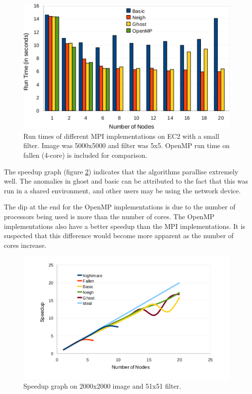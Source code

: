 \documentclass{article}
\begin{document}
\begin{figure}[h]
  \centering
  \includegraphics{images/mpi_vs_openmp}
  \caption{Run times of different MPI implementations on EC2 with a small
    filter. Image was 5000x5000 and filter was 5x5. OpenMP run time on fallen
    (4-core) is included for comparison.}
  \label{fig:mpivsopenmp}
\end{figure}

The speedup graph (figure \ref{fig:speedup}) indicates that the algorithms
parallise extremely well. The anomalies in ghost and basic can be attributed
to the fact that this was run in a shared environment, and other users may be
using the network device.

The dip at the end for the OpenMP implementations is due to the number of
processors being used is more than the number of cores. The OpenMP
implementations also have a better speedup than the MPI implementations. It is
suspected that this difference would become more apparent as the number of
cores increase.

\begin{figure}[h]
  \centering
  \includegraphics{images/speedup}
  \caption{Speedup graph on 2000x2000 image and 51x51 filter.}
  \label{fig:speedup}
\end{figure}
\end{document}

